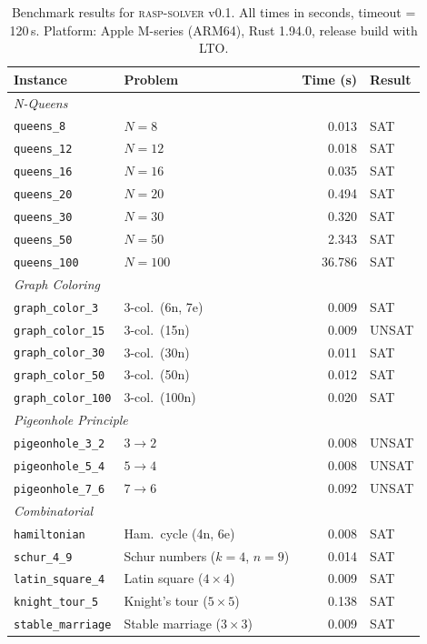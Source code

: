 
\begin{table}[t]
\centering
\caption{Benchmark results for \textsc{rasp-solver} v0.1.
All times in seconds, timeout = 120\,s.
Platform: Apple M-series (ARM64), Rust 1.94.0, release build with LTO.}
\label{tab:benchmarks-v1}
\begin{tabular}{llrl}
\toprule
\textbf{Instance} & \textbf{Problem} & \textbf{Time (s)} & \textbf{Result} \\
\midrule
\multicolumn{4}{l}{\emph{N-Queens}} \\
\texttt{queens\_8}        & $N{=}8$         & 0.013 & SAT \\
\texttt{queens\_12}       & $N{=}12$        & 0.018 & SAT \\
\texttt{queens\_16}       & $N{=}16$        & 0.035 & SAT \\
\texttt{queens\_20}       & $N{=}20$        & 0.494 & SAT \\
\texttt{queens\_30}       & $N{=}30$        & 0.320 & SAT \\
\texttt{queens\_50}       & $N{=}50$        & 2.343 & SAT \\
\texttt{queens\_100}      & $N{=}100$       & 36.786 & SAT \\
\midrule
\multicolumn{4}{l}{\emph{Graph Coloring}} \\
\texttt{graph\_color\_3}  & 3-col.\ (6n, 7e)   & 0.009 & SAT \\
\texttt{graph\_color\_15} & 3-col.\ (15n)       & 0.009 & UNSAT \\
\texttt{graph\_color\_30} & 3-col.\ (30n)       & 0.011 & SAT \\
\texttt{graph\_color\_50} & 3-col.\ (50n)       & 0.012 & SAT \\
\texttt{graph\_color\_100}& 3-col.\ (100n)      & 0.020 & SAT \\
\midrule
\multicolumn{4}{l}{\emph{Pigeonhole Principle}} \\
\texttt{pigeonhole\_3\_2} & $3 \to 2$       & 0.008 & UNSAT \\
\texttt{pigeonhole\_5\_4} & $5 \to 4$       & 0.008 & UNSAT \\
\texttt{pigeonhole\_7\_6} & $7 \to 6$       & 0.092 & UNSAT \\
\midrule
\multicolumn{4}{l}{\emph{Combinatorial}} \\
\texttt{hamiltonian}      & Ham.\ cycle (4n, 6e) & 0.008 & SAT \\
\texttt{schur\_4\_9}      & Schur numbers ($k{=}4$, $n{=}9$) & 0.014 & SAT \\
\texttt{latin\_square\_4} & Latin square ($4{\times}4$) & 0.009 & SAT \\
\texttt{knight\_tour\_5}  & Knight's tour ($5{\times}5$) & 0.138 & SAT \\
\texttt{stable\_marriage} & Stable marriage ($3{\times}3$) & 0.009 & SAT \\
\bottomrule
\end{tabular}


\end{table}
